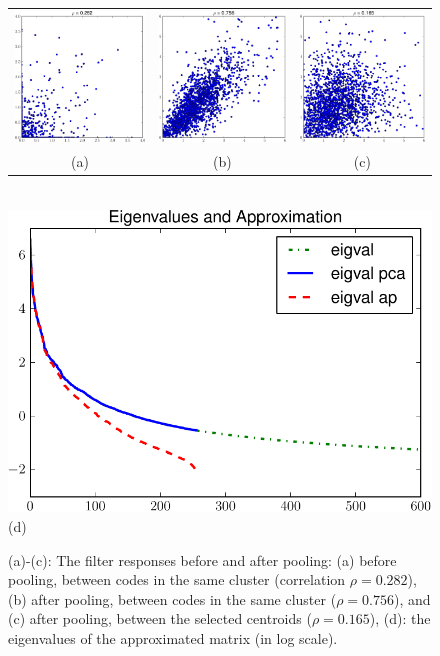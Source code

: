 \begin{figure}
    \centering
    \begin{tabular}{ccc}
        \includegraphics[height=0.25\textwidth]{figs/sizematters/distribution/within_cluster_prepooling.pdf} &
        \includegraphics[height=0.25\textwidth]{figs/sizematters/distribution/within_cluster_postpooling.pdf} &
        \includegraphics[height=0.25\textwidth]{figs/sizematters/distribution/between_centroids_postpooling.pdf}\\
        (a) & (b) & (c)
    \end{tabular}\\
    \includegraphics[height=0.3\textwidth]{figs/sizematters/centroids/eigvals.pdf}\\
    (d)
    \caption{(a)-(c): The filter responses before and after pooling: (a) before pooling, between codes in the same cluster (correlation $\rho=0.282$), (b) after pooling, between codes in the same cluster ($\rho = 0.756$), and (c) after pooling, between the selected centroids ($\rho = 0.165$), (d): the eigenvalues of the approximated matrix (in log scale).}\label{fig:pairwiseresponses}
\end{figure}

